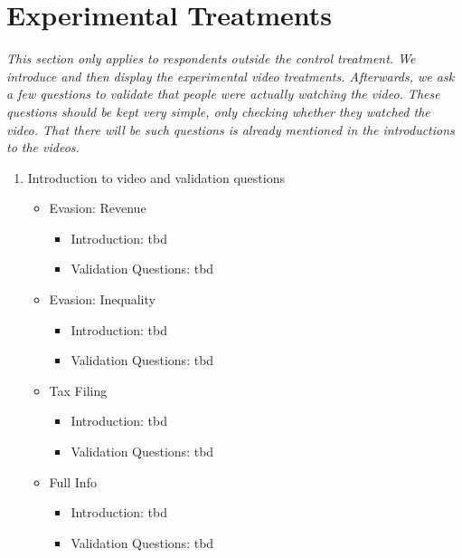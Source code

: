 \documentclass[11pt]{article}
\begin{document}
\section*{Experimental Treatments}
\textit{This section only applies to respondents outside the control treatment. We introduce and then display the experimental video treatments. Afterwards, we ask a few questions to validate that people were actually watching the video. These questions should be kept very simple, only checking whether they watched the video. That there will be such questions is already mentioned in the introductions to the videos.}
\begin{enumerate}[resume]
    \item Introduction to video and validation questions
    \begin{itemize}
        \item Evasion: Revenue
        \begin{itemize}
            \item Introduction: tbd
            \item Validation Questions: tbd
        \end{itemize}
        \item Evasion: Inequality 
        \begin{itemize}
            \item Introduction: tbd
            \item Validation Questions: tbd
        \end{itemize}
        \item Tax Filing
        \begin{itemize}
            \item Introduction: tbd
            \item Validation Questions: tbd
        \end{itemize}
        \item Full Info
        \begin{itemize}
            \item Introduction: tbd
            \item Validation Questions: tbd
        \end{itemize}
    \end{itemize}
\end{enumerate}
\end{document}
